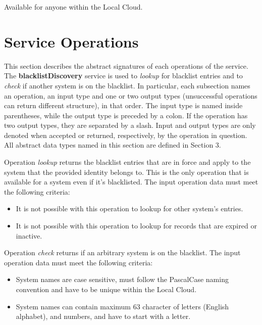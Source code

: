 \documentclass[a4paper]{arrowhead}
\begin{document}
Available for anyone within the Local Cloud.

\newpage

\section{Service Operations}
\label{sec:functions}

This section describes the abstract signatures of each operations of the service. The \textbf{blacklistDiscovery} service is used to \textit{lookup} for blacklist entries and to \textit{check} if another system is on the blacklist.
In particular, each subsection names an operation, an input type and one or two output types (unsuccessful operations can return different structure), in that order.
The input type is named inside parentheses, while the output type is preceded by a colon. If the operation has two output types, they are separated by a slash.
Input and output types are only denoted when accepted or returned, respectively, by the operation in question. All abstract data types named in this section are defined in Section 3.

{}

Operation \textit{lookup} returns the blacklist entries that are in force and apply to the system that the provided identity belongs to. This is the only operation that is available for a system even if it's blacklisted. The input operation data must meet the following criteria:

\begin{itemize}
    \item It is not possible with this operation to lookup for other system's entries.
    \item It is not possible with this operation to lookup for records that are expired or inactive.
\end{itemize}


Operation \textit{check} returns if an arbitrary system is on the blacklist. The input operation data must meet the following criteria:
\begin{itemize}
    \item System names are case sensitive, must follow the PascalCase naming convention and have to be unique within the Local Cloud.
    \item System names can contain maximum 63 character of letters (English alphabet), and numbers, and have to start with a letter.
\end{itemize}
\clearpage
\end{document}
